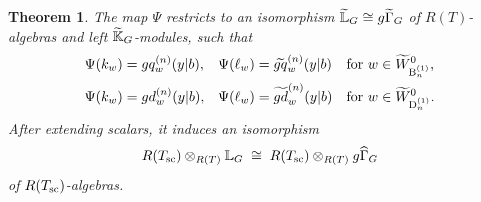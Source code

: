 \documentclass[a4paper]{amsart}
\newcommand{\ike}[1]{\todo[size=\tiny,color=blue!30]{#1}}
\newtheorem{thm}{Theorem}[section]
\theoremstyle{remark}
\numberwithin{equation}{section}
\begin{document}
\begin{thm} \label{T:Peterson to symm funcs}
The map $\Psi$ restricts to an isomorphism $\tLG \cong \gGtil_{G}$ of $R(T)$-algebras and left $\tKG$-modules, 
such that
\begin{align}
    \Psi(k_w) &= \gq{w}{n}(y| b), & \Psi(\ell_w) &= \tgq{w}{n}(y| b)&&\text{for $w\in \WBexgr{n}$,} \label{eq:def_gq}\\
    \Psi(k_w) &= \gd{w}{n}(y| b), &    \Psi(\ell_w)&= \tgd{w}{n}(y| b) &&\text{for $w\in \WDexgr{n}$.}
   \label{eq:def_gd}
\end{align}
After extending scalars, it induces an isomorphism
\[
\Rsc\otimes_{\RT}\LG
\;\cong\;
\Rsc\otimes_{\RT}\gGhat_G
\]
of $\Rsc$-algebras.\end{thm}
\end{document}
